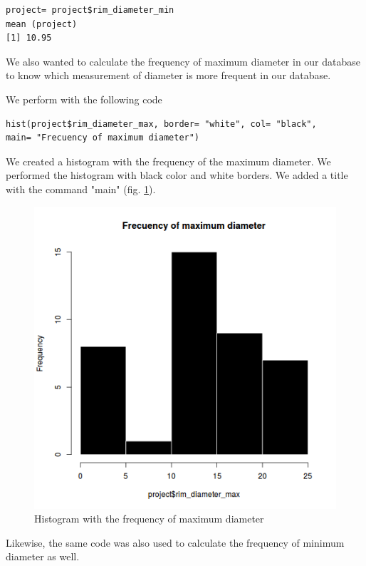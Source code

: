 \documentclass[10pt,a4paper]{article}
\begin{document}
\begin{verbatim}
project= project$rim_diameter_min
mean (project)
[1] 10.95
\end{verbatim}

We also wanted to calculate the frequency of maximum diameter in our database to know which measurement of diameter is more frequent in our database. 

We perform with the following code

\begin{verbatim}
hist(project$rim_diameter_max, border= "white", col= "black", 
main= "Frecuency of maximum diameter")
\end{verbatim}

We created a histogram with the frequency of the maximum diameter. We performed the histogram with black color and white borders. We added a title with the command "main" (fig. \ref{histomax}).

\begin{figure}[htp]
\centering
\includegraphics[scale=0.50]{histomax.png}
\caption{Histogram with the frequency of maximum diameter}
\label{histomax}
\end{figure} 

\newpage

Likewise, the same code was also used to calculate the frequency of minimum diameter as well. 
\end{document}
